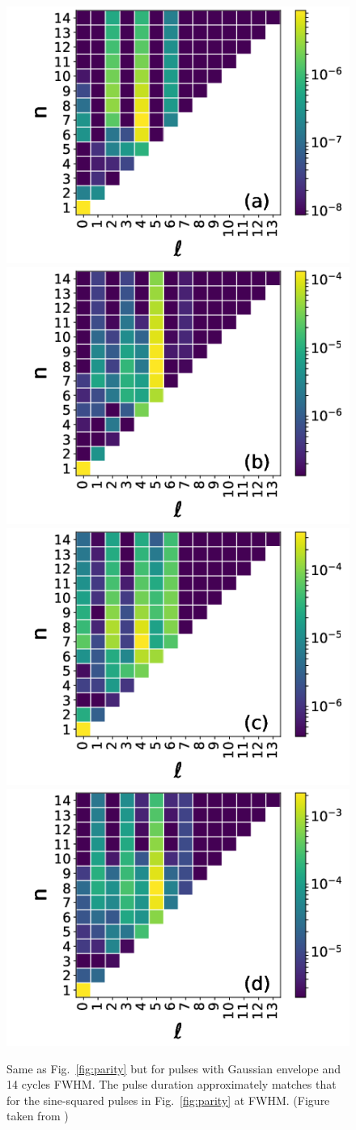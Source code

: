 \begin{figure}[!ht]
\centering
\includegraphics[width=0.32\columnwidth]{figs/Rydberg/heat_14_cyc_gauss_3p4e13.png}
\includegraphics[width=0.32\columnwidth]{figs/Rydberg/heat_14_cyc_gauss_6p0e13.png}\\
\includegraphics[width=0.32\columnwidth]{figs/Rydberg/heat_14_cyc_gauss_8p6e13.png}
\includegraphics[width=0.32\columnwidth]{figs/Rydberg/heat_14_cyc_gauss_11p2e13.png}
\caption{\label{fig:parity_gauss}
Same as Fig.~\ref{fig:parity} but for pulses with Gaussian envelope and 14 cycles FWHM. The pulse duration approximately matches that for the sine-squared pulses in Fig.~\ref{fig:parity} at FWHM. (Figure taken from \cite{venzke2018_ryd})
}
\end{figure}

